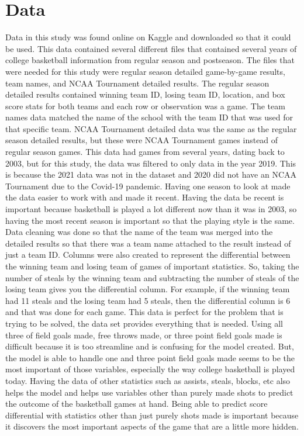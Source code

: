 \documentclass{article}
\begin{document}
\section{Data}
Data in this study was found online on Kaggle and downloaded so that it could be used. This data contained several different files that contained several years of college basketball information from regular season and postseason. The files that were needed for this study were regular season detailed game-by-game results, team names, and NCAA Tournament detailed results. The regular season detailed results contained winning team ID, losing team ID, location, and box score stats for both teams and each row or observation was a game. The team names data matched the name of the school with the team ID that was used for that specific team. NCAA Tournament detailed data was the same as the regular season detailed results, but these were NCAA Tournament games instead of regular season games. 
\newline \indent This data had games from several years, dating back to 2003, but for this study, the data was filtered to only data in the year 2019. This is because the 2021 data was not in the dataset and 2020 did not have an NCAA Tournament due to the Covid-19 pandemic. Having one season to look at made the data easier to work with and made it recent. Having the data be recent is important because basketball is played a lot different now than it was in 2003, so having the most recent season is important so that the playing style is the same. Data cleaning was done so that the name of the team was merged into the detailed results so that there was a team name attached to the result instead of just a team ID. Columns were also created to represent the differential between the winning team and losing team of games of important statistics. So, taking the number of steals by the winning team and subtracting the number of steals of the losing team gives you the differential column. For example, if the winning team had 11 steals and the losing team had 5 steals, then the differential column is 6 and that was done for each game. 
\newline \indent This data is perfect for the problem that is trying to be solved, the data set provides everything that is needed. Using all three of field goals made, free throws made, or three point field goals made is difficult because it is too streamline and is confusing for the model created.  But, the model is able to handle one and three point field goals made seems to be the most important of those variables, especially the way college basketball is played today. Having the data of other statistics such as assists, steals, blocks, etc also helps the model and helps use variables other than purely made shots to predict the outcome of the basketball games at hand. Being able to predict score differential with statistics other than just purely shots made is important because it discovers the most important aspects of the game that are a little more hidden. 
\end{document}
